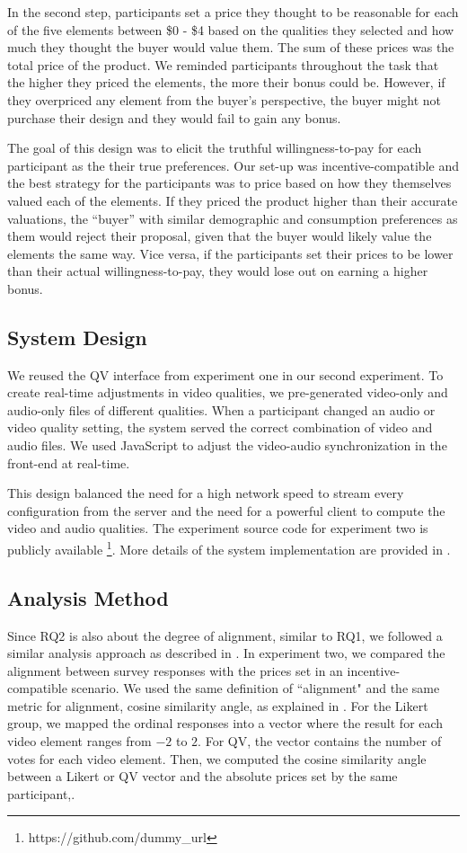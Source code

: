 In the second step, participants set a price they thought to be reasonable for each of the five elements between \$0 - \$4 based on the qualities they selected and how much they thought the buyer would value them. The sum of these prices was the total price of the product. We reminded participants throughout the task that the higher they priced the elements, the more their bonus could be. However, if they overpriced any element from the buyer's perspective, the buyer might not purchase their design and they would fail to gain any bonus. 

The goal of this design was to elicit the truthful willingness-to-pay for each participant as the their true preferences. Our set-up was incentive-compatible and the best strategy for the participants was to price based on how they themselves valued each of the elements. If they priced the product higher than their accurate valuations, the ``buyer'' with similar demographic and consumption preferences as them would reject their proposal, given that the buyer would likely value the elements the same way. Vice versa, if the participants set their prices to be lower than their actual willingness-to-pay, they would lose out on earning a higher bonus.

\subsection{System Design}
We reused the QV interface from experiment one in our second experiment. To create real-time adjustments in video qualities, we pre-generated video-only and audio-only files of different qualities. When a participant changed an audio or video quality setting, the system served the correct combination of video and audio files. We used JavaScript to adjust the video-audio synchronization in the front-end at real-time.

This design balanced the need for a high network speed to stream every configuration from the server and the need for a powerful client to compute the video and audio qualities. The experiment source code for experiment two is publicly available \footnote{https://github.com/dummy\_url}. More details of the system implementation are provided in .

\subsection{Analysis Method}

Since RQ2 is also about the degree of alignment, similar to RQ1, we followed a similar analysis approach as described in . In experiment two, we compared the alignment between survey responses with the prices set in an incentive-compatible scenario. We used the same definition of ``alignment" and the same metric for alignment, cosine similarity angle, as explained in . For the Likert group, we mapped the ordinal responses into a vector where the result for each video element ranges from $-2$ to $2$. For QV, the vector contains the number of votes for each video element. Then, we computed the cosine similarity angle between a Likert or QV vector and the absolute prices set by the same participant,.

